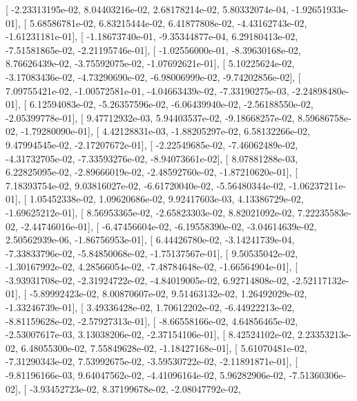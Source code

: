 \documentclass{article}
\begin{document}
       [ -2.23313195e-02,   8.04403216e-02,   2.68178214e-02,
          5.80332074e-04,  -1.92651933e-01],
       [  5.68586781e-02,   6.83215444e-02,   6.41877808e-02,
         -4.43162743e-02,  -1.61231181e-01],
       [ -1.18673740e-01,  -9.35344877e-04,   6.29180413e-02,
         -7.51581865e-02,  -2.21195746e-01],
       [ -1.02556000e-01,  -8.39630168e-02,   8.76626439e-02,
         -3.75592075e-02,  -1.07692621e-01],
       [  5.10225624e-02,  -3.17083436e-02,  -4.73290690e-02,
         -6.98006999e-02,  -9.74202856e-02],
       [  7.09755421e-02,  -1.00572581e-01,  -4.04663439e-02,
         -7.33190275e-03,  -2.24898480e-01],
       [  6.12594083e-02,  -5.26357596e-02,  -6.06439940e-02,
         -2.56188550e-02,  -2.05399778e-01],
       [  9.47712932e-03,   5.94403537e-02,  -9.18668257e-02,
          8.59686758e-02,  -1.79280090e-01],
       [  4.42128831e-03,  -1.88205297e-02,   6.58132266e-02,
          9.47994545e-02,  -2.17207672e-01],
       [ -2.22549685e-02,  -7.46062489e-02,  -4.31732705e-02,
         -7.33593276e-02,  -8.94073661e-02],
       [  8.07881288e-03,   6.22825095e-02,  -2.89666019e-02,
         -2.48592760e-02,  -1.87210620e-01],
       [  7.18393754e-02,   9.03816027e-02,  -6.61720040e-02,
         -5.56480344e-02,  -1.06237211e-01],
       [  1.05452338e-02,   1.09620686e-02,   9.92417603e-03,
          4.13386729e-02,  -1.69625212e-01],
       [  8.56953365e-02,  -2.65823303e-02,   8.82021092e-02,
          7.22235583e-02,  -2.44746016e-01],
       [ -6.47456604e-02,  -6.19558390e-02,  -3.04614639e-02,
          2.50562939e-06,  -1.86756953e-01],
       [  6.44426780e-02,  -3.14241739e-04,  -7.33833796e-02,
         -5.84850068e-02,  -1.75137567e-01],
       [  9.50535042e-02,  -1.30167992e-02,   4.28566054e-02,
         -7.48784648e-02,  -1.66564904e-01],
       [ -3.93931708e-02,  -2.31924722e-02,  -4.84019005e-02,
          6.92714808e-02,  -2.52117132e-01],
       [ -5.89992423e-02,   8.00870607e-02,   9.51463132e-02,
          1.26492029e-02,  -1.33246739e-01],
       [  3.49336428e-02,   1.70612202e-02,  -6.44922213e-02,
         -8.81159628e-02,  -2.57927313e-01],
       [ -8.66558166e-02,   4.64856465e-02,  -2.53007617e-03,
          3.13038206e-02,  -2.37154106e-01],
       [  8.42524102e-02,   2.23353213e-02,   6.48055300e-02,
          7.55849628e-02,  -1.18427168e-01],
       [  5.61070481e-02,  -7.31290343e-02,   7.53992675e-02,
         -3.59530722e-02,  -2.11891871e-01],
       [ -9.81196166e-03,   9.64047562e-02,  -4.41096164e-02,
          5.96282906e-02,  -7.51360306e-02],
       [ -3.93452723e-02,   8.37199678e-02,  -2.08047792e-02,
\end{document}
